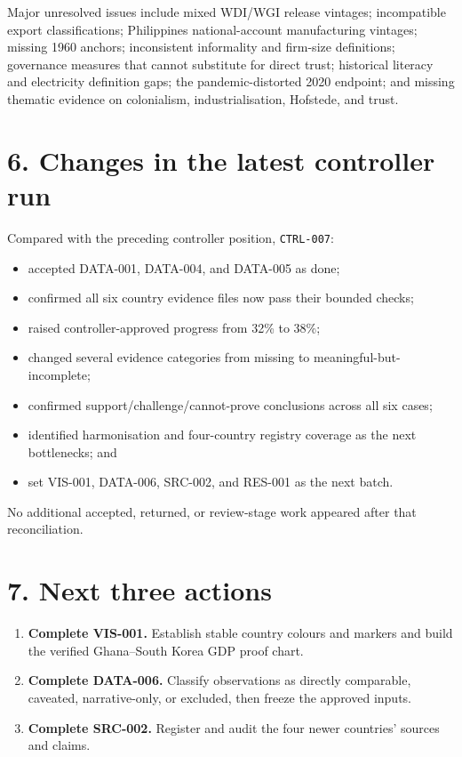 \documentclass[10pt,a4paper]{article}
\begin{document}
Major unresolved issues include mixed WDI/WGI release vintages; incompatible export classifications; Philippines national-account manufacturing vintages; missing 1960 anchors; inconsistent informality and firm-size definitions; governance measures that cannot substitute for direct trust; historical literacy and electricity definition gaps; the pandemic-distorted 2020 endpoint; and missing thematic evidence on colonialism, industrialisation, Hofstede, and trust.

\section{6. Changes in the latest controller run}

Compared with the preceding controller position, \texttt{CTRL-007}:

\begin{itemize}
  \item accepted DATA-001, DATA-004, and DATA-005 as done;
  \item confirmed all six country evidence files now pass their bounded checks;
  \item raised controller-approved progress from 32\% to 38\%;
  \item changed several evidence categories from missing to meaningful-but-incomplete;
  \item confirmed support/challenge/cannot-prove conclusions across all six cases;
  \item identified harmonisation and four-country registry coverage as the next bottlenecks; and
  \item set VIS-001, DATA-006, SRC-002, and RES-001 as the next batch.
\end{itemize}

No additional accepted, returned, or review-stage work appeared after that reconciliation.

\section{7. Next three actions}

\begin{enumerate}
  \item \textbf{Complete VIS-001.} Establish stable country colours and markers and build the verified Ghana--South Korea GDP proof chart.
  \item \textbf{Complete DATA-006.} Classify observations as directly comparable, caveated, narrative-only, or excluded, then freeze the approved inputs.
  \item \textbf{Complete SRC-002.} Register and audit the four newer countries' sources and claims.
\end{enumerate}
\end{document}
